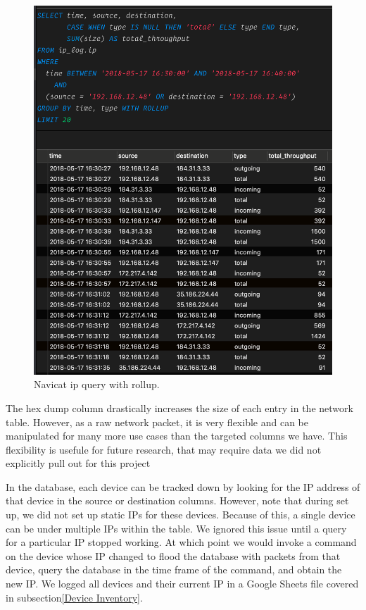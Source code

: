 \begin{figure}[H]
    \centering
    \includegraphics[width=1\textwidth]{figures/navicatRollup.png}
    \caption{Navicat ip query with rollup.}
    \label{fig:navicatRollup}
\end{figure}

The hex dump column drastically increases the size of each entry in the network table. However, as a raw network packet, it is very flexible and can be manipulated for many more use cases than the targeted columns we have. This flexibility is usefule for future research, that may require data we did not explicitly pull out for this project

In the database, each device can be tracked down by looking for the IP address of that device in the source or destination columns. However, note that during set up, we did not set up static IPs for these devices. Because of this, a single device can be under multiple IPs within the table. We ignored this issue until a query for a particular IP stopped working. At which point we would invoke a command on the device whose IP changed to flood the database with packets from that device, query the database in the time frame of the command, and obtain the new IP. We logged all devices and their current IP in a Google Sheets \cite{googleSheets} file covered in subsection\ref{Device Inventory}.

